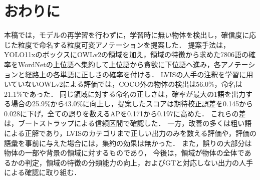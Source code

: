 \section{おわりに}
本稿では，モデルの再学習を行わずに，学習時に無い物体を検出し，確信度に応じた粒度で命名する粒度可変アノテーションを提案した．
提案手法は，YOLO11xのボックスにOWLv2の領域を加え，領域の特徴から求めた7806語の確率をWordNetの上位語へ集約して上位語から貪欲に下位語へ進み，各アノテーションと経路上の各単語に正しさの確率を付ける．
LVISの人手の注釈を学習に用いていないOWLv2による評価では，COCO外の物体の検出は56.0\%，命名は21.1\%であった．
同じ領域に対する命名の正しさは，確率が最大の1語を出力する場合の25.9\%から43.0\%に向上し，提案したスコアは期待校正誤差を0.145から0.028に下げ，全ての誤りを数えるAPを0.171から0.197に高めた．
これらの差は，ブートストラップによる信頼区間で確認した．
一方，改善の多くは粗い語による正解であり，LVISのカテゴリまで正しい出力のみを数える評価や，評価の語彙を事前に与えた場合には，集約の効果は無かった．
また，誤りの大部分は物体の一部や背景の領域に対するものであり，
今後は，領域が物体の全体であるかの判定，領域の特徴の分類能力の向上，およびGTと対応しない出力の人手による確認に取り組む．
